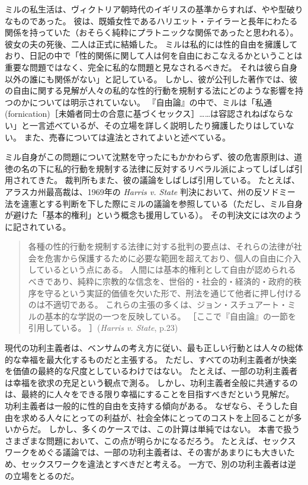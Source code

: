 \documentclass[paper=a4,book,openany]{jlreq}
\begin{document}
ミルの私生活は、ヴィクトリア朝時代のイギリスの基準からすれば、やや型破りなものであった。
彼は、既婚女性であるハリエット・テイラーと長年にわたる関係を持っていた（おそらく純粋にプラトニックな関係であったと思われる）。
彼女の夫の死後、二人は正式に結婚した。
ミルは私的には性的自由を擁護しており、日記の中で「性的関係に関して人は何を自由におこなえるかということは重要な問題ではなく、完全に私的な問題と見なされるべきだ。
それは彼ら自身以外の誰にも関係がない」と記している\citep[p.664]{mill88:diary}。
しかし、彼が公刊した著作では、彼の自由に関する見解が人々の私的な性的行動を規制する法にどのような影響を持つのかについては明示されていない。
『自由論』の中で、ミルは「私通(fornication)［未婚者同士の合意に基づくセックス］……は容認されねばならない」と一言述べているが、その立場を詳しく説明したり擁護したりはしていない。
また、売春については違法とされてよいと述べている\citep[p.96]{mill15:_liber_utilit_other_essay}。

ミル自身がこの問題について沈黙を守ったにもかかわらず、彼の危害原則は、道徳の名の下に私的行動を規制する法律に反対するリベラル派によってしばしば引用されてきた。
裁判所もまた、彼の議論をしばしば引用している。
たとえば、アラスカ州最高裁は、1969年の \emph{Harris v. State} 判決において、州の反ソドミー法を違憲とする判断を下した際にミルの議論を参照している（ただし、ミル自身が避けた「基本的権利」という概念も援用している）。
その判決文には次のように記されている。

\begin{quote}
各種の性的行動を規制する法律に対する批判の要点は、それらの法律が社会を危害から保護するために必要な範囲を超えており、個人の自由に介入しているという点にある。
人間には基本的権利として自由が認められるべきであり、純粋に宗教的な信念を、世俗的・社会的・経済的・政府的秩序を守るという実証的価値を欠いた形で、刑法を通じて他者に押し付けるのは不適切である。
これらの主張の多くは、ジョン・スチュアート・ミルの基本的な学説の一つを反映している。
［ここで『自由論』の一節を引用している。
］(\emph{Harris v. State}, p.23)

\end{quote}

現代の功利主義者は、ベンサムの考え方に従い、最も正しい行動とは人々の総体的な幸福を最大化するものだと主張する。
ただし、すべての功利主義者が快楽を価値の最終的な尺度としているわけではない。
たとえば、一部の功利主義者は幸福を欲求の充足という観点で測る。
しかし、功利主義者全般に共通するのは、最終的に人々をできる限り幸福にすることを目指すべきだという見解だ。
功利主義者は一般的に性的自由を支持する傾向がある。
なぜなら、そうした自由を求める人々にとっての利益が、社会全体にとってのコストを上回ることが多いからだ。
しかし、多くのケースでは、この計算は単純ではない。
本書で扱うさまざまな問題において、この点が明らかになるだろう。
たとえば、セックスワークをめぐる議論では、一部の功利主義者は、その害があまりにも大きいため、セックスワークを違法とすべきだと考える。
一方で、別の功利主義者は逆の立場をとるのだ。
\end{document}
